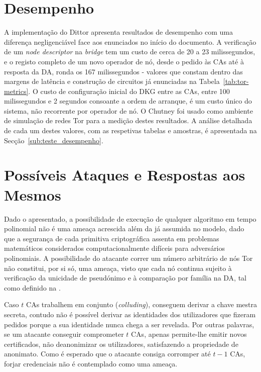 \section{Desempenho}
\label{sec:avaliacao_desempenho_intro}

A implementação do Dittor apresenta resultados de desempenho com uma diferença negligenciável face aos  enunciados no início do documento. A verificação de um \textit{node descriptor} na \textit{bridge} tem um custo de cerca de 20 a 23 milissegundos, e o registo completo de um novo operador de nó, desde o pedido às CAs até à resposta da DA, ronda os 167 milissegundos - valores que constam dentro das margens de latência e construção de circuitos já enunciadas na Tabela~\ref{tab:tor-metrics}. O custo de configuração inicial do DKG entre as CAs, entre 100 milissegundos e 2 segundos consoante a ordem de arranque, é um custo único do sistema, não recorrente por operador de nó. O Chutney foi usado como ambiente de simulação de redes Tor para a medição destes resultados. A análise detalhada de cada um destes valores, com as respetivas tabelas e amostras, é apresentada na Secção~\ref{sub:teste_desempenho}.

\section{Possíveis Ataques e Respostas aos Mesmos}
\label{sec:avaliacao_possiveis_ataques}

Dado o  apresentado, a possibilidade de execução de qualquer algoritmo em tempo polinomial não é uma ameaça acrescida além da já assumida no modelo, dado que a segurança de cada primitiva criptográfica assenta em problemas matemáticos considerados computacionalmente difíceis para adversários polinomiais. A possibilidade do atacante correr um número arbitrário de nós Tor não constitui, por si só, uma ameaça, visto que cada nó continua sujeito à verificação da unicidade de pseudónimo e à comparação por família na DA, tal como definido na .

Caso $t$ CAs trabalhem em conjunto (\textit{colluding}), conseguem derivar a chave mestra secreta, contudo não é possível derivar as identidades dos utilizadores que fizeram pedidos porque a sua identidade nunca chega a ser revelada. Por outras palavras, se um atacante conseguir comprometer $t$ CAs, apenas permite-lhe emitir novos certificados, não deanonimizar os utilizadores, satisfazendo a propriedade de anonimato. Como é esperado que o atacante consiga corromper até $t-1$ CAs, forjar credenciais não é contemplado como uma ameaça.

